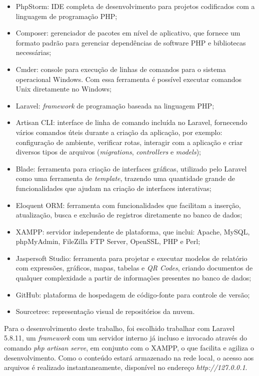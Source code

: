 \begin{itemize}
    \item PhpStorm: IDE completa de desenvolvimento para projetos codificados com a linguagem de programação PHP;
    \item Composer: gerenciador de pacotes em nível de aplicativo, que fornece um formato padrão para gerenciar dependências de software PHP e bibliotecas necessárias;
    \item Cmder: console para execução de linhas de comandos para o sistema operacional Windows. Com essa ferramenta é possível executar comandos Unix diretamente no Windows;
    \item Laravel: \textit{framework} de programação baseada na linguagem PHP;
    \item Artisan CLI: interface de linha de comando incluída no Laravel, fornecendo vários comandos úteis durante a criação da aplicação, por exemplo: configuração de ambiente, verificar rotas, interagir com a aplicação e criar diversos tipos de arquivos (\textit{migrations}, \textit{controllers} e \textit{models});
    \item Blade: ferramenta para criação de interfaces gráficas, utilizado pelo Laravel como uma ferramenta de \textit{template}, trazendo uma quantidade grande de funcionalidades que ajudam na criação de interfaces interativas;
    \item Eloquent ORM: ferramenta com funcionalidades que facilitam a inserção, atualização, busca e exclusão de registros diretamente no banco de dados;
    \item XAMPP: servidor independente de plataforma, que inclui: Apache, MySQL, phpMyAdmin, FileZilla FTP Server, OpenSSL, PHP e Perl;
    \item Jaspersoft Studio: ferramenta para projetar e executar modelos de relatório com expressões, gráficos, mapas, tabelas e \textit{QR Codes}, criando documentos de qualquer complexidade a partir de informações presentes no banco de dados;
    \item GitHub: plataforma de hospedagem de código-fonte para controle de versão;
    \item Sourcetree: representação visual de repositórios da nuvem.
\end{itemize}

\newpage
Para o desenvolvimento deste trabalho, foi escolhido trabalhar com Laravel 5.8.11, um \textit{framework} com um servidor interno já incluso e invocado através do comando \textit{php artisan serve}, em conjunto com o XAMPP, o que facilita e agiliza o desenvolvimento. Como o conteúdo estará armazenado na rede local, o acesso aos arquivos é realizado instantaneamente, disponível no endereço \textit{http://127.0.0.1}.

